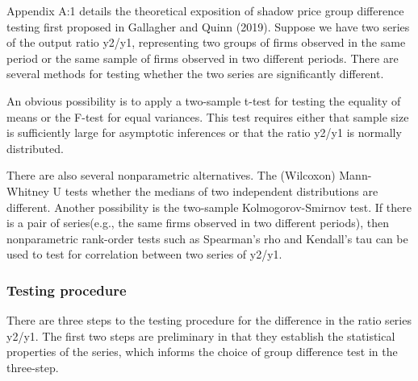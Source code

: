 \documentclass[
  10pt,
]{article}
\begin{document}
Appendix A:1 details the theoretical exposition of shadow price group
difference testing first proposed in Gallagher and Quinn (2019). Suppose
we have two series of the output ratio y2/y1, representing two groups of
firms observed in the same period or the same sample of firms observed
in two different periods. There are several methods for testing whether
the two series are significantly different.

An obvious possibility is to apply a two-sample t-test for testing the
equality of means or the F-test for equal variances. This test requires
either that sample size is sufficiently large for asymptotic inferences
or that the ratio y2/y1 is normally distributed.

There are also several nonparametric alternatives. The (Wilcoxon)
Mann-Whitney U tests whether the medians of two independent
distributions are different. Another possibility is the two-sample
Kolmogorov-Smirnov test. If there is a pair of series(e.g., the same
firms observed in two different periods), then nonparametric rank-order
tests such as Spearman's rho and Kendall's tau can be used to test for
correlation between two series of y2/y1.

\hypertarget{testing-procedure}{%
\subsubsection{Testing procedure}\label{testing-procedure}}

There are three steps to the testing procedure for the difference in the
ratio series y2/y1. The first two steps are preliminary in that they
establish the statistical properties of the series, which informs the
choice of group difference test in the three-step.
\end{document}
